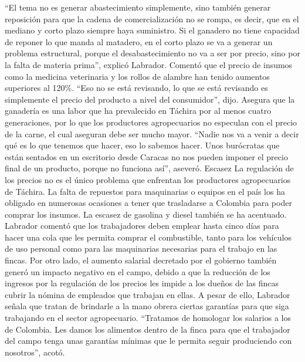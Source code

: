 \documentclass{article}%
\begin{document}
%
“El tema no es generar abastecimiento simplemente, sino también generar reposición para que la cadena de comercialización no se rompa, es decir, que en el mediano y corto plazo siempre haya suministro. Si el ganadero no tiene capacidad de reponer lo que manda al matadero, en el corto plazo se va a generar un problema estructural, porque el desabastecimiento no va a ser por precio, sino por la falta de materia prima”, explicó Labrador.%
\newline%
%
Comentó que el precio de insumos como la medicina veterinaria y los rollos de alambre han tenido aumentos superiores al 120\%. “Eso no se está revisando, lo que se está revisando es simplemente el precio del producto a nivel del consumidor”, dijo.%
\newline%
%
Asegura que la ganadería es una labor que ha prevalecido en Táchira por al menos cuatro generaciones, por lo que los productores agropecuarios no especulan con el precio de la carne, el cual aseguran debe ser mucho mayor.%
\newline%
%
“Nadie nos va a venir a decir qué es lo que tenemos que hacer, eso lo sabemos hacer. Unos burócratas que están sentados en un escritorio desde Caracas no nos pueden imponer el precio final de un producto, porque no funciona así”, aseveró.%
\newline%
%
Escasez%
\newline%
%
La regulación de los precios no es el único problema que enfrentan los productores agropecuarios de Táchira. La falta de repuestos para maquinarias o equipos en el país los ha obligado en numerosas ocasiones a tener que trasladarse a Colombia para poder comprar los insumos.%
\newline%
%
La escasez de gasolina y diesel también se ha acentuado. Labrador comentó que los trabajadores deben emplear hasta cinco días para hacer una cola que les permita comprar el combustible, tanto para los vehículos de uso personal como para las maquinarias necesarias para el trabajo en las fincas.%
\newline%
%
Por otro lado, el aumento salarial decretado por el gobierno también generó un impacto negativo en el campo, debido a que la reducción de los ingresos por la regulación de los precios les impide a los dueños de las fincas cubrir la nómina de empleados que trabajan en ellas.%
\newline%
%
A pesar de ello, Labrador señala que tratan de brindarle a la mano obrera ciertas garantías para que siga trabajando en el sector agropecuario. “Tratamos de homologar los salarios a los de Colombia. Les damos los alimentos dentro de la finca para que el trabajador del campo tenga unas garantías mínimas que le permita seguir produciendo con nosotros”, acotó.%
\end{document}
